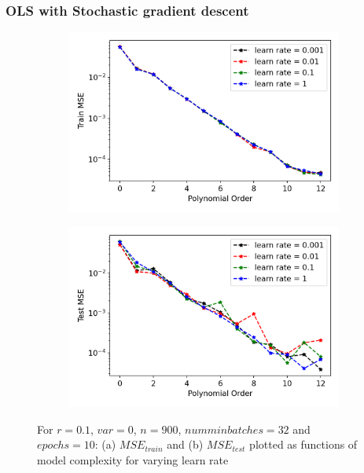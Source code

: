 \subsubsection{OLS with Stochastic gradient descent}

\begin{figure}
\centering
\begin{subfigure}{.5\textwidth}
  \centering
  \includegraphics[width=.9\linewidth]{Images/olssgd2.png}
  \caption{}
  \label{fig:olssgd2}
\end{subfigure}%
\begin{subfigure}{.5\textwidth}
  \centering
  \includegraphics[width=.9\linewidth]{Images/olssgd1.png}
  \caption{}
  \label{fig:olssgd1}
\end{subfigure}
\caption{For $r=0.1$, $var=0$, $n=900$, $num min batches = 32$ and $epochs=10$: (a) $MSE_{train}$ and (b) $MSE_{test}$ plotted as functions of model complexity for varying learn rate}
\label{fig:ols sgd learnrate}
\end{figure}


